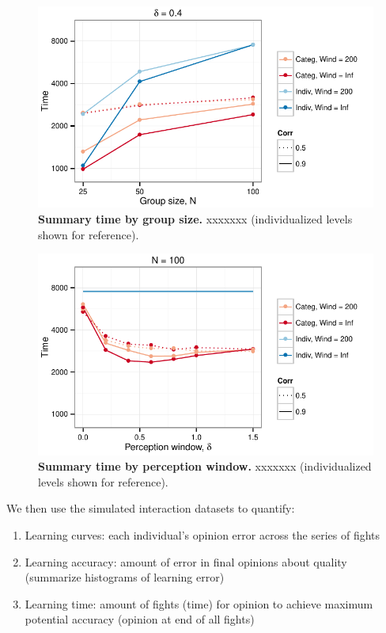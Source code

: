 \begin{figure}
\caption{\sffamily\small\textbf{Summary time by group size.}
     xxxxxxx (individualized levels shown for reference).}
\label{summary_time_groupsize}
\includegraphics[width=.8\textwidth]{figures/summary_time_groupsize.pdf}
\end{figure}

\begin{figure}
\caption{\sffamily\small\textbf{Summary time by perception window.}
     xxxxxxx (individualized levels shown for reference).}
\label{summary_time_percwindow}
\includegraphics[width=.8\textwidth]{figures/summary_time_percwindow.pdf}
\end{figure}


\newpage






We then use the simulated interaction datasets to quantify: 
\begin{enumerate}
  \item Learning curves: each individual's opinion error across the series of fights 
  \item Learning accuracy: amount of error in final opinions about quality (summarize histograms of learning error)
  \item Learning time: amount of fights (time) for opinion to achieve maximum potential accuracy (opinion at end of all fights)  
\end{enumerate}